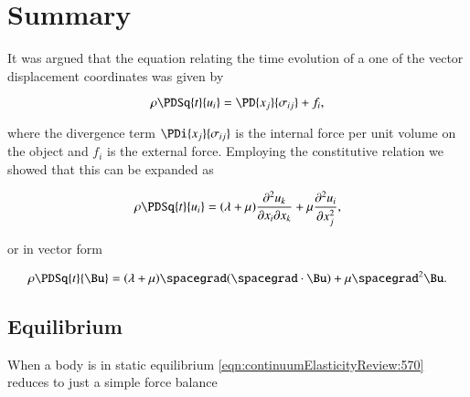 % 
% 
% 
% 
% 
% 
% 
% 
% 
% 
% 
% 
\section{Summary}

It was argued that the equation relating the time evolution of a one of the vector displacement coordinates was given by

\begin{equation}\label{eqn:continuumElasticityReview:570}
\rho \PDSq{t}{u_i} = \PD{x_j}{\sigma_{ij}} + f_i,
\end{equation}

where the divergence term $\PDi{x_j}{\sigma_{ij}}$ is the internal force per unit volume on the object and $f_i$ is the external force.  Employing the constitutive relation we showed that this can be expanded as

\begin{equation}\label{eqn:continuumElasticityReview:590}
\rho \PDSq{t}{u_i} = (\lambda + \mu) \frac{\partial^2 u_k}{\partial x_i \partial x_k}
+ \mu
\frac{\partial^2 u_i}
{\partial x_j^2
},
\end{equation}

or in vector form

\begin{equation}\label{eqn:continuumElasticityReview:610}
\rho \PDSq{t}{\Bu} = (\lambda + \mu) \spacegrad (\spacegrad \cdot \Bu) + \mu \spacegrad^2 \Bu.
\end{equation}

\subsection{Equilibrium}

When a body is in static equilibrium \ref{eqn:continuumElasticityReview:570} reduces to just a simple force balance

